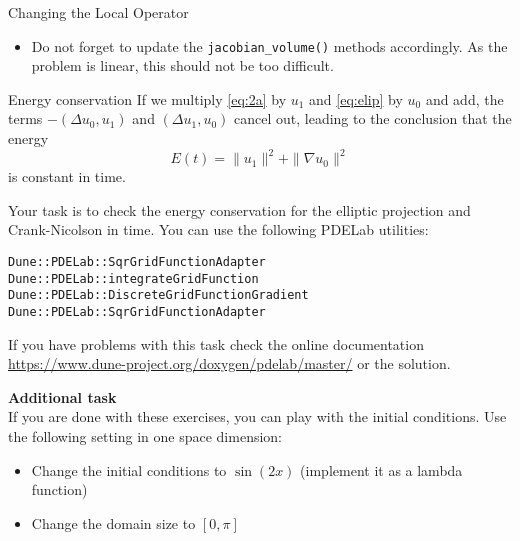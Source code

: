 \documentclass[12pt,a4paper]{article}
\begin{document}
\begin{Exercise}{Changing the Local Operator}
\begin{itemize}
    See how it is done for the $\Delta u_0$, we recall the
    corresponding part of \lstinline{WaveL2::alpha_volume()}:
  \begin{lstlisting}
// integrate u*phi_i
for (size_t i=0; i<lfsu0.size(); i++) {
	r.accumulate(lfsu0,i,u1*phihat[i]*factor);
	r.accumulate(lfsu1,i,u0*phihat[i]*factor);
}
  \end{lstlisting}

  \item Do not forget to update the \lstinline{jacobian_volume()}
    methods accordingly. As the problem is linear, this should not be
    too difficult.
  \end{itemize}
\end{Exercise}


\begin{Exercise}{Energy conservation}
  If we multiply \eqref{eq:2a} by $u_1$ and \eqref{eq:elip} by $u_0$
  and add, the terms $-(\Delta u_0,u_1 )$ and $(\Delta u_1,u_0 )$
  cancel out, leading to the conclusion that the energy
  $$E(t) = \|u_1\|^2 + \| \nabla u_0\|^2 $$ is constant in time.


  Your task is to check the energy conservation for the elliptic
  projection and Crank-Nicolson in time. You can use the following
  PDELab utilities:
  \begin{lstlisting}
Dune::PDELab::SqrGridFunctionAdapter
Dune::PDELab::integrateGridFunction
Dune::PDELab::DiscreteGridFunctionGradient
Dune::PDELab::SqrGridFunctionAdapter
  \end{lstlisting}

  If you have problems with this task check the online documentation
  \url{https://www.dune-project.org/doxygen/pdelab/master/} or the
  solution.
\end{Exercise}


\textbf{Additional task}\\
If you are done with these exercises, you can play with the initial
conditions. Use the following setting in one space dimension:
\begin{itemize}
\item Change the initial conditions to $\sin(2x)$ (implement it as a
  lambda function)
\item Change the domain size to $[0,\pi]$
\end{itemize}




\end{document}
